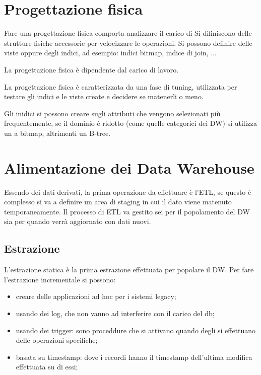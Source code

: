 \documentclass[12pt]{article}
\begin{document}
\newpage
\section{Progettazione fisica}
Fare una progettazione fisica comporta analizzare il carico di
Si difiniscono delle strutture fisiche accessorie per velocizzare le operazioni. Si possono definire delle viste oppure degli indici, ad esempio: indici bitmap, indice di join, ...

La progettazione fisica \`e dipendente dal carico di lavoro. 

La progettazione fisica \`e caratterizzata da una fase di tuning, utilizzata per testare gli indici e le viste create e decidere se matenerli o meno. 

Gli inidici si possono creare sugli attributi che vengono selezionati pi\`u frequentemente, se il dominio \`e ridotto (come quelle categorici dei DW) si utilizza un a bitmap, altrimenti un B-tree.


\newpage
\section{Alimentazione dei Data Warehouse}
Essendo dei dati derivati, la prima operazione da effettuare \`e l'ETL, se questo \`e complesso si va a definire un area di staging in cui il dato viene matenuto temporaneamente. Il processo di ETL va gestito sei per il popolamento del DW sia per quando verr\`a aggiornato con dati nuovi.

\subsection{Estrazione}
L'estrazione statica \`e la prima estrazione effettuata per popolare il DW. Per fare l'estrazione incrementale si possono:
\begin{itemize}
    \item creare delle applicazioni ad hoc per i sistemi legacy;
    \item usando dei log, che non vanno ad interferire con il carico del db;
    \item usando dei trigger: sono proceddure che si attivano quando degli si effettuano delle operazioni specifiche;
    \item basata su timestamp: dove i recordi hanno il timestamp dell'ultima modifica effettuata su di essi;
\end{itemize}
\end{document}
